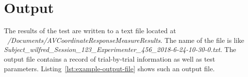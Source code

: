 \documentclass[11pt,pdftex,letterpaper]{article}
\begin{document}
\section{Output}
The results of the test are written to a text file located at \textit{\string~/Documents/AVCoordinateResponseMeasureResults}. The name of the file is like \textit{Subject\_wilfred\_Session\_123\_Experimenter\_456\_2018-6-24-10-30-0.txt}. The output file contains a record of trial-by-trial information as well as test parameters. Listing~\ref{lst:example-output-file} shows such an output file.

\noindent\begin{minipage}{\textwidth}

\end{minipage}
\end{document}
